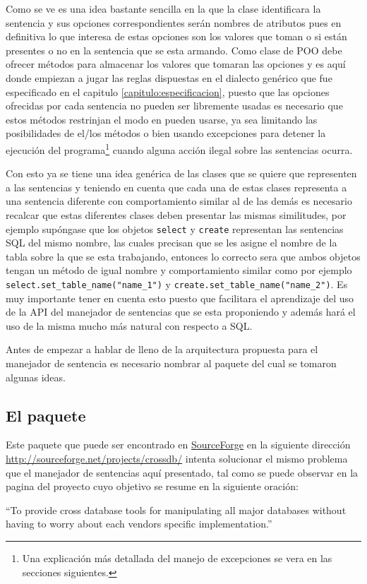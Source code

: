 Como se ve es una idea bastante sencilla en la que la clase identificara la sentencia y sus opciones correspondientes serán nombres de atributos pues en definitiva lo que interesa de estas opciones son los valores que toman o si están presentes o no en la sentencia que se esta armando. Como clase de POO debe ofrecer métodos para almacenar los valores que tomaran las opciones y es aquí donde empiezan a jugar las reglas dispuestas en el dialecto genérico que fue especificado en el capitulo \ref{capitulo:especificacion}, puesto que las opciones ofrecidas por cada sentencia no pueden ser libremente usadas es necesario que estos métodos restrinjan el modo en pueden usarse, ya sea limitando las posibilidades de el/los métodos o bien usando excepciones para detener la ejecución del programa\footnote{Una explicación más detallada del manejo de excepciones se vera en las secciones siguientes.} cuando alguna acción ilegal sobre las sentencias ocurra.

Con esto ya se tiene una idea genérica de las clases que se quiere que representen a las sentencias y teniendo en cuenta que cada una de estas clases representa a una sentencia diferente con comportamiento similar al de las demás es necesario recalcar que estas diferentes clases deben presentar las mismas similitudes, por ejemplo supóngase que los objetos \verb|select| y \verb|create| representan las sentencias SQL del mismo nombre, las cuales precisan que se les asigne el nombre de la tabla sobre la que se esta trabajando, entonces lo correcto sera que ambos objetos tengan un método de igual nombre y comportamiento similar como por ejemplo \verb=select.set_table_name("name_1")= y \verb=create.set_table_name("name_2")=. Es muy importante tener en cuenta esto puesto que facilitara el aprendizaje del uso de la API del manejador de sentencias que se esta proponiendo y además hará el uso de la misma mucho más natural con respecto a SQL.

Antes de empezar a hablar de lleno de la arquitectura propuesta para el manejador de sentencia es necesario nombrar al paquete \cc del cual se tomaron algunas ideas.
%
\subsection{El paquete \cc}
Este paquete que puede ser encontrado en \href{http://sourceforge.net}{SourceForge} en la siguiente dirección \url{http://sourceforge.net/projects/crossdb/} intenta solucionar el mismo problema que el manejador de sentencias aquí presentado, tal como se puede observar en la pagina del proyecto cuyo objetivo se resume en la siguiente oración:
%
\begin{center}
``To provide cross database tools for manipulating all major databases without having to worry about each vendors specific implementation.''
\end{center} 

